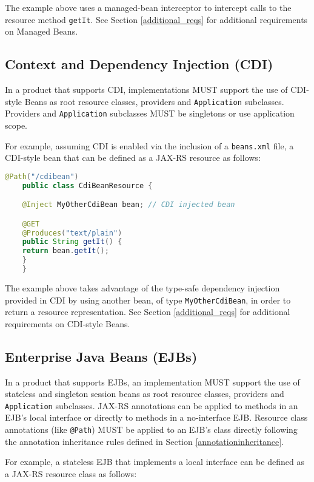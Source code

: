 The example above uses a managed-bean interceptor to intercept calls to the resource method \lstinline{getIt}. See
Section \ref{additional_reqs} for additional requirements on Managed Beans.

\subsection{Context and Dependency Injection (CDI)}
\label{cdi}
In a product that supports CDI, implementations MUST support the use of CDI-style Beans as root resource classes,
providers and \lstinline{Application} subclasses. Providers and \lstinline{Application} subclasses MUST be singletons or
use application scope.

For example, assuming CDI is enabled via the inclusion of a \lstinline{beans.xml} file, a CDI-style bean that can be
defined as a JAX-RS resource as follows:

\begin{lstlisting}[language=Java]
    @Path("/cdibean")
    public class CdiBeanResource {

    @Inject MyOtherCdiBean bean; // CDI injected bean

    @GET
    @Produces("text/plain")
    public String getIt() {
    return bean.getIt();
    }
    }
\end{lstlisting}

The example above takes advantage of the type-safe dependency injection provided in CDI by using another bean, of type
\lstinline{MyOtherCdiBean}, in order to return a resource representation. See Section \ref{additional_reqs} for
additional requirements on CDI-style Beans.

\subsection{Enterprise Java Beans (EJBs)}
\label{ejbs}

In a product that supports EJBs, an implementation MUST support the use of stateless and singleton session beans as root
resource classes, providers and \lstinline{Application} subclasses.
JAX-RS annotations can be applied to methods in an EJB's local interface or directly to methods in a no-interface EJB.
Resource class annotations (like \lstinline{@Path}) MUST be applied to an EJB's class directly following the annotation
inheritance rules defined in Section \ref{annotationinheritance}.

For example, a stateless EJB that implements a local interface can be defined as a JAX-RS resource class as follows:

